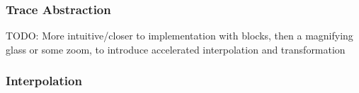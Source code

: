 \begin{frame}[t]
	\frametitle{Trace Abstraction}
	\begin{center}
		TODO: More intuitive/closer to implementation with blocks, then a magnifying glass or some zoom, to introduce accelerated interpolation and transformation
		
	\end{center}
\end{frame}

\begin{frame}[t]
	\frametitle{Interpolation}
\end{frame}